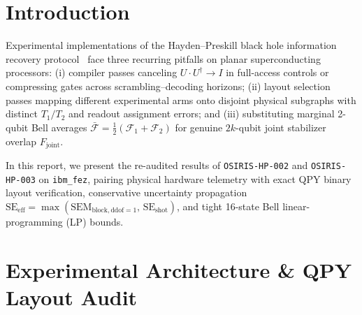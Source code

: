 \documentclass[aps,prxquantum,reprint,superscriptaddress,floatfix]{revtex4-2}
\begin{document}
\section{Introduction}
Experimental implementations of the Hayden--Preskill black hole information recovery protocol~\cite{hayden2007black,nielsen2010quantum} face three recurring pitfalls on planar superconducting processors: (i) compiler passes canceling $U \cdot U^\dagger \to I$ in full-access controls or compressing gates across scrambling--decoding horizons; (ii) layout selection passes mapping different experimental arms onto disjoint physical subgraphs with distinct $T_1/T_2$ and readout assignment errors; and (iii) substituting marginal 2-qubit Bell averages $\bar{\mathcal{F}} = \frac{1}{2}(\mathcal{F}_1 + \mathcal{F}_2)$ for genuine $2k$-qubit joint stabilizer overlap $F_{\mathrm{joint}}$.

In this report, we present the re-audited results of \texttt{OSIRIS-HP-002} and \texttt{OSIRIS-HP-003} on \texttt{ibm\_fez}, pairing physical hardware telemetry with exact QPY binary layout verification, conservative uncertainty propagation $\mathrm{SE}_{\mathrm{eff}} = \max(\mathrm{SEM}_{\mathrm{block,ddof=1}},\, \mathrm{SE}_{\mathrm{shot}})$, and tight 16-state Bell linear-programming (LP) bounds.

\section{Experimental Architecture \& QPY Layout Audit}
\end{document}
